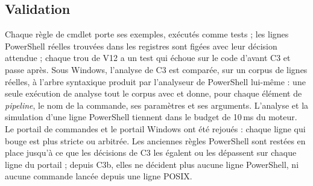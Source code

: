 \subsection{Validation}
Chaque règle de cmdlet porte ses exemples, exécutés comme tests ; les lignes PowerShell réelles
trouvées dans les registres sont figées avec leur décision attendue ; chaque trou de V12 a un
test qui échoue sur le code d'avant C3 et passe après. Sous Windows, l'analyse de C3 est
comparée, sur un corpus de lignes réelles, à l'arbre syntaxique produit par l'analyseur de
PowerShell lui-même : une seule exécution de  analyse tout le corpus avec
 et donne, pour chaque élément de
\textit{pipeline}, le nom de la commande, ses paramètres et ses arguments. L'analyse et la
simulation d'une ligne PowerShell tiennent dans le budget de 10\,ms du moteur. Le portail de \nbcorpus{} commandes et le portail Windows ont été rejoués :
chaque ligne qui bouge est plus stricte ou arbitrée. Les anciennes règles PowerShell sont
restées en place jusqu'à ce que les décisions de C3 les égalent ou les dépassent sur chaque ligne
du portail ; depuis C3b, elles ne décident plus aucune ligne PowerShell, ni aucune commande
 lancée depuis une ligne POSIX.

